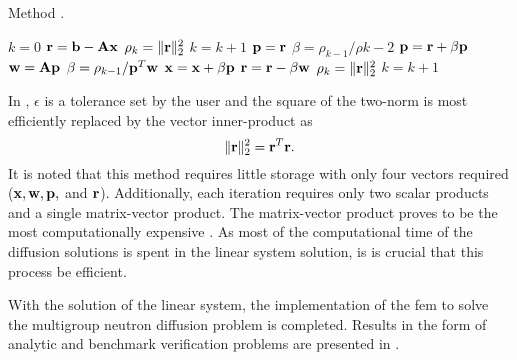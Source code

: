     \begin{algorithm}
      \caption{ Method \cite{Kelley1995IterativeEquations}.}
      \label{algorithm:CG}
      \begin{algorithmic}[1]
        \State $k = 0$
        \State $\mathbf{r} = \mathbf{b} - \mathbf{A} \mathbf{x}$
        \State $\rho_k = \|\mathbf{r}\|_2^2$
        \State $k = k + 1$
            \State $\mathbf{p} = \mathbf{r}$
          \Else
            \State $\beta = \rho_{k-1} / \rho{k-2}$
            \State $\mathbf{p} = \mathbf{r} + \beta \mathbf{p}$
          \EndIf
          \State $\mathbf{w} = \mathbf{A} \mathbf{p}$
          \State $\beta = \rho_{k-1} / \mathbf{p}^{T} \mathbf{w}$
          \State $\mathbf{x} = \mathbf{x} + \beta \mathbf{p}$
          \State $\mathbf{r} = \mathbf{r} - \beta \mathbf{w}$
          \State $\rho_k = \| \mathbf{r} \|_2^2$
          \State $k=k+1$
        \EndWhile
      \end{algorithmic}
    \end{algorithm}
    
    In , $\epsilon$ is a tolerance set by the user 
    and the square of the two-norm is most efficiently replaced by the vector
    inner-product as 
    \begin{equation}
      \label{eq:two_norm_inner}
      \|\mathbf{r}\|_2^2 = \mathbf{r}^{T} \mathbf{r}.
    \end{equation}
    It is noted that this method requires little storage with only four vectors
    required ($\mathbf{x}, \mathbf{w}, \mathbf{p},$ and $\mathbf{r}$). Additionally, each iteration requires
    only two scalar products and a single matrix-vector product. The
    matrix-vector product proves to be the most computationally expensive
    \cite{Kelley1995IterativeEquations}. As most of the computational time of
    the diffusion solutions is spent in the linear system solution, is is
    crucial that this process be efficient.

    With the solution of the linear system, the implementation of the \gls{fem}
    to solve the multigroup neutron diffusion problem is completed. Results in 
    the form of analytic and benchmark verification problems are presented in
    .
